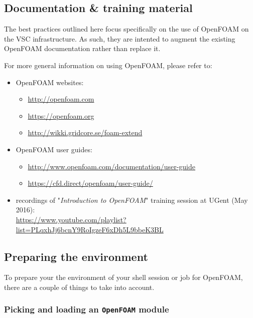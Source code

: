 \subsection{Documentation \& training material}
\label{sec:best-practices-openfoam-documentation}

The best practices outlined here focus specifically on the use of OpenFOAM on the VSC \hpc infrastructure.
As such, they are intented to augment the existing OpenFOAM documentation rather than replace it.

For more general information on using OpenFOAM, please refer to:

\begin{itemize}
\item OpenFOAM websites:
\begin{itemize}
    \item \url{http://openfoam.com}
    \item \url{https://openfoam.org}
    \item \url{http://wikki.gridcore.se/foam-extend}
\end{itemize}
\item OpenFOAM user guides:
    \begin{itemize}
    \item \url{http://www.openfoam.com/documentation/user-guide}
    \item \url{https://cfd.direct/openfoam/user-guide/}
    \end{itemize}
\item recordings of "\textit{Introduction to OpenFOAM}" training session at UGent (May 2016):\\
      \small{\url{https://www.youtube.com/playlist?list=PLqxhJj6bcnY9RoIgzeF6xDh5L9bbeK3BL}}
\end{itemize}


\subsection{Preparing the environment}
\label{sec:best-practices-openfoam-environment}

To prepare your the environment of your shell session or job for OpenFOAM, there are a couple of things to take into
account.


\subsubsection{Picking and loading an \texttt{OpenFOAM} module}

